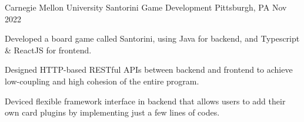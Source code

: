 \begin{cventries}
  \cventry
    {Carnegie Mellon University} %
    {Santorini Game Development} %
    {Pittsburgh, PA} %
    {Nov 2022} %
    {
      \begin{cvitems} %
        \item {Developed a board game called Santorini, using Java for backend, and Typescript \& ReactJS for 
        frontend.}
        \item {Designed HTTP-based RESTful APIs between backend and frontend to achieve low-coupling and 
        high cohesion of the entire program.}
        \item {Deviced flexible framework interface in backend that allows users to add their own card plugins 
        by implementing just a few lines of codes.}
      \end{cvitems}
    }


\end{cventries}
